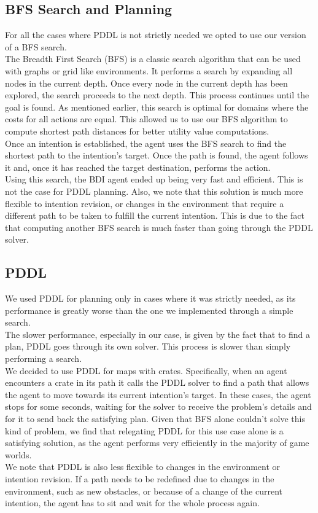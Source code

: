 \documentclass[11pt,a4paper]{article}
\begin{document}
\subsection{BFS Search and Planning}
For all the cases where PDDL is not strictly needed we opted to use our version of a BFS search.
\\The Breadth First Search (BFS) is a classic search algorithm that can be used with graphs or grid like environments.
It performs a search by expanding all nodes in the current depth. Once every node in the current depth has been explored, the search proceeds to the next depth. This process continues until the goal is found.
As mentioned earlier, this search is optimal for domains where the costs for all actions are equal. This allowed us to use our BFS algorithm to compute shortest path distances for better utility value computations.
\\Once an intention is established, the agent uses the BFS search to find the shortest path to the intention's target. Once the path is found, the agent follows it and, once it has reached the target destination, performs the action.
\\Using this search, the BDI agent ended up being very fast and efficient. This is not the case for PDDL planning. 
Also, we note that this solution is much more flexible to intention revision, or changes in the environment that require a different path to be taken to fulfill the current intention.
This is due to the fact that computing another BFS search is much faster than going through the PDDL solver.

\subsection{PDDL}
We used PDDL for planning only in cases where it was strictly needed, as its performance is greatly worse than the one we implemented through a simple search. 
\\The slower performance, especially in our case, is given by the fact that to find a plan, PDDL goes through its own solver. This process is slower than simply performing a search.
\\We decided to use PDDL for maps with crates. Specifically, when an agent encounters a crate in its path it calls the PDDL solver to find a path that allows the agent to move towards its current intention's target.
In these cases, the agent stops for some seconds, waiting for the solver to receive the problem's details and for it to send back the satisfying plan.
Given that BFS alone couldn't solve this kind of problem, we find that relegating PDDL for this use case alone is a satisfying solution, as the agent performs very efficiently in the majority of game worlds.
\\We note that PDDL is also less flexible to changes in the environment or intention revision. 
If a path needs to be redefined due to changes in the environment, such as new obstacles, or because of a change of the current intention, the agent has to sit and wait for the whole process again.
\end{document}
